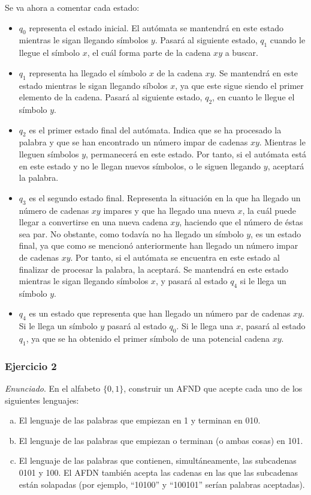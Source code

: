 \documentclass[11pt,a4paper]{article}
\newcommand{\enu}{\textit{Enunciado}}
\begin{document}
		Se va ahora a comentar cada estado:
		
		\begin{itemize}
			\item $q_0$ representa el estado inicial. El autómata se mantendrá en este estado mientras le sigan
			llegando símbolos $y$. Pasará al siguiente estado, $q_1$ cuando le llegue el símbolo $x$, el 	cuál forma
			parte de la cadena $xy$ a buscar.
			\item $q_1$ representa ha llegado el símbolo $x$ de la cadena $xy$. Se mantendrá en este estado
			mientras le sigan llegando síbolos $x$, ya que este sigue siendo el primer elemento de la cadena.
			Pasará al siguiente estado, $q_2$, en cuanto le llegue el símbolo $y$.
			\item $q_2$ es el primer estado final del autómata. Indica que se ha procesado la palabra y que se han
			encontrado un número impar de cadenas $xy$. Mientras le lleguen símbolos $y$, permanecerá en este estado.
			Por tanto, si el autómata está en este estado y no le llegan nuevos símbolos, o le siguen llegando $y$,
			aceptará la palabra.
			\item $q_3$ es el segundo estado final. Representa la situación en la que ha llegado un número de cadenas
			$xy$ impares y que ha llegado una nueva $x$, la cuál puede llegar a convertirse en una nueva cadena $xy$,
			haciendo que el número de éstas sea par. No obstante, como todavía no ha llegado un símbolo $y$, es un
			estado final, ya que como se mencionó anteriormente han llegado un número impar de cadenas $xy$. Por tanto,
			si el autómata se encuentra en este estado al finalizar de procesar la palabra, la aceptará. Se mantendrá
			en este estado mientras le sigan llegando símbolos $x$, y pasará al estado $q_4$ si le llega un símbolo $y$.
			\item $q_4$ es un estado que representa que han llegado un número par de cadenas $xy$. Si le llega un
			símbolo $y$ pasará al estado $q_0$. Si le llega una $x$, pasará al estado $q_1$, ya que se ha obtenido el
			primer símbolo de una potencial cadena $xy$.
		\end{itemize}
		
		
		\subsubsection{Ejercicio 2}
		\enu. En el alfabeto  $\lbrace 0, 1 \rbrace$, construir un AFND que acepte cada uno de los siguientes
		lenguajes:
		
		\begin{enumerate}[a)]
			\item El lenguaje de las palabras que empiezan en 1 y terminan en 010.
			\item El lenguaje de las palabras que empiezan o terminan (o ambas cosas) en 101.
			\item El lenguaje de las palabras que contienen, simultáneamente, las subcadenas 0101 y 100.
			El AFDN también acepta las cadenas en las que las subcadenas están solapadas (por ejemplo, ``10100” y
			``100101” serían palabras aceptadas).
		\end{enumerate}
		
\end{document}
